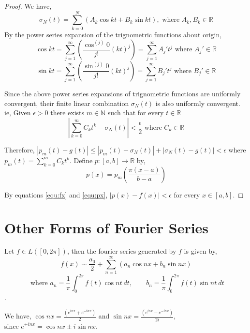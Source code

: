 \begin{proof}
		We have,
		\begin{equation}
			\sigma_N(t) = \sum_{k=0}^N \left(A_k \cos kt + B_k \sin kt \right),\text{ where } A_k, B_k \in \mathbb{R}
			\label{equ:sigmaN}
		\end{equation}
		By the power series expansion of the trignometric functions about origin,
		\begin{equation}
			\cos kt = \sum_{j = 1}^\infty \left(\frac{\cos^{(j)} 0}{j!} (kt)^j \right)  = \sum_{j = 1}^\infty A_j' t^j \text{ where } A_j' \in \mathbb{R}
			\label{equ:coskt}
		\end{equation}
		\begin{equation}
			\sin kt = \sum_{j = 1}^\infty \left(\frac{\sin^{(j)} 0}{j!} (kt)^j \right)  = \sum_{j = 1}^\infty B_j' t^j \text{ where } B_j' \in \mathbb{R}
			\label{equ:sinkt}
		\end{equation}

		Since the above power series expansions of trignometric functions are uniformly convergent, their finite linear combination $\sigma_N(t)$ is also uniformly convergent. ie, Given $\epsilon > 0$ there exists $m \in \mathbb{N}$ such that for every $t \in \mathbb{R}$
		$$\left|\sum_{k = 0}^m C_k t^k - \sigma_N(t)\right| < \frac{\epsilon}{2} \text{ where } C_k \in \mathbb{R}$$

		Therefore, $| p_m(t) - g(t)| \le | p_m(t) - \sigma_N(t) | + |\sigma_N(t) - g(t)| < \epsilon$ where $p_m(t) = \sum_{k = 0}^m C_k t^k$. Define $p : [a,b] \to \mathbb{R}$ by,
		\begin{equation}
			p(x) = p_m\left( \frac{\pi(x-a)}{b-a} \right)
			\label{equ:px}
		\end{equation}

		By equations \ref{equ:fx} and \ref{equ:px}, $|p(x)-f(x)| < \epsilon$ for every $x \in [a,b]$.
	\end{proof}
\section{Other Forms of Fourier Series}
	Let $f \in L([0,2\pi])$, then the fourier series generated by $f$ is given by,
	$$f(x) \sim \frac{a_0}{2}+\sum_{n=1}^\infty \left( a_n \cos nx + b_n \sin nx \right) $$
	$$ \text{ where } a_n = \frac{1}{\pi} \int_0^{2\pi} f(t) \cos nt\ dt,\qquad b_n = \frac{1}{\pi} \int_0^{2\pi} f(t) \sin nt\ dt$$.

	We have, $\cos nx = \frac{(e^{inx}+e^{-inx})}{2}$ and $\sin nx = \frac{(e^{inx}-e^{-inx})}{2i}$,\\
	since $e^{\pm inx} = \cos nx \pm i \sin nx$.

